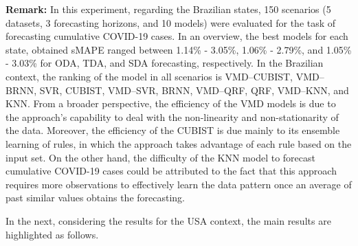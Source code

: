 \textbf{Remark:} In this experiment, regarding the Brazilian states, 150 scenarios (5 datasets, 3 forecasting horizons, and 10 models) were evaluated for the task of forecasting cumulative \ac{COVID-19} cases. In an overview, the best models for each state, obtained \ac{sMAPE} ranged between 1.14\% - 3.05\%, 1.06\% - 2.79\%, and 1.05\% - 3.03\% for \ac{ODA}, \ac{TDA}, and \ac{SDA} forecasting, respectively. In the Brazilian context, the ranking of the model in all scenarios is \ac{VMD}--\ac{CUBIST}, \ac{VMD}--\ac{BRNN}, \ac{SVR}, \ac{CUBIST}, \ac{VMD}--\ac{SVR}, \ac{BRNN}, \ac{VMD}--\ac{QRF}, \ac{QRF}, \ac{VMD}--\ac{KNN}, and \ac{KNN}. From a broader perspective, the efficiency of the \ac{VMD} models is due to the approach's capability to deal with the non-linearity and non-stationarity of the data. Moreover, the efficiency of the \ac{CUBIST} is due mainly to its ensemble learning of rules, in which the approach takes advantage of each rule based on the input set. On the other hand, the difficulty of the \ac{KNN} model to forecast cumulative \ac{COVID-19} cases could be attributed to the fact that this approach requires more observations to effectively learn the data pattern once an average of past similar values obtains the forecasting. 

In the next, considering the results for the \ac{USA} context, the main results are highlighted as follows.

